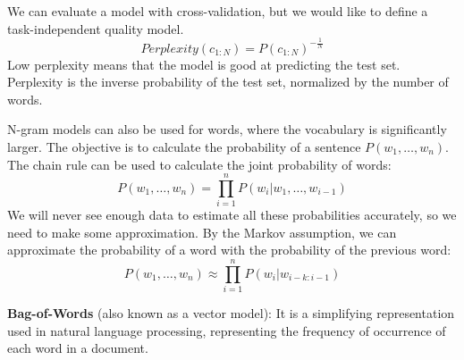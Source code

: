 \documentclass[12pt]{article}
\begin{document}
\begin{enumerate}[label=\textbf{NLP.\arabic*}]
          We can evaluate a model with cross-validation, but we would like to define a task-independent quality model.
          \begin{equation}
              \textit{Perplexity}(c_{1:N}) = P(c_{1:N})^{-\frac{1}{N}}
          \end{equation}
          Low perplexity means that the model is good at predicting the test set. Perplexity is the inverse probability of the test set, normalized by the number of words.

          N-gram models can also be used for words, where the vocabulary is significantly larger. The objective is to calculate the probability of a sentence $P(w_1,\ldots,w_n)$. The chain rule can be used to calculate the joint probability of words:
          \begin{equation}
              P(w_1,\ldots,w_n) = \prod_{i=1}^{n}P(w_i|w_1,\ldots,w_{i-1})
          \end{equation}
          We will never see enough data to estimate all these probabilities accurately, so we need to make some approximation. By the Markov assumption, we can approximate the probability of a word with the probability of the previous word:
          \begin{equation}
              P(w_1,\ldots,w_n) \approx \prod_{i=1}^{n}P(w_i|w_{i-k:i-1})
          \end{equation}

          \textbf{Bag-of-Words} (also known as a vector model): It is a simplifying representation used in natural language processing, representing the frequency of occurrence of each word in a document.


\end{enumerate}
\end{document}
